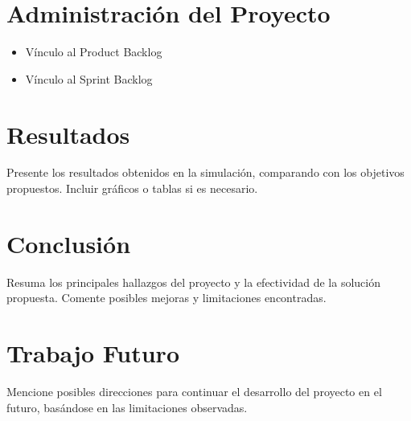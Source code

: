 \documentclass[sjournal]{IEEEtran}
\begin{document}
\section{Administración del Proyecto}
\begin{itemize}
    \item Vínculo al Product Backlog
    \item Vínculo al Sprint Backlog
\end{itemize}

\section{Resultados}
Presente los resultados obtenidos en la simulación, comparando con los objetivos propuestos. Incluir gráficos o tablas si es necesario.

\section{Conclusión}
Resuma los principales hallazgos del proyecto y la efectividad de la solución propuesta. Comente posibles mejoras y limitaciones encontradas.

\section{Trabajo Futuro}
Mencione posibles direcciones para continuar el desarrollo del proyecto en el futuro, basándose en las limitaciones observadas.




\end{document}

